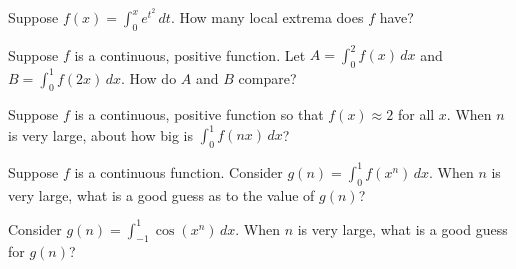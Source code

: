 \documentclass{ximera}
\newcommand{\recommendation}[1]{}
\begin{document}
\begin{shuffle}
\begin{problem}
  Suppose $f(x) = \int_0^x e^{t^2} \, dt$.  How many local extrema does $f$ have?
  \begin{multipleChoice}
  \end{multipleChoice}
\end{problem}



\begin{problem}
  Suppose $f$ is a continuous, positive function.  Let $A = \int_0^2 f(x) \, dx$ and $B = \int_0^1 f(2x) \, dx$.  How do $A$ and $B$ compare?
  \begin{multipleChoice}
  \end{multipleChoice}
\end{problem}

\begin{problem}
  Suppose $f$ is a continuous, positive function so that $f(x) \approx 2$ for all $x$.  When $n$ is very large, about how big is $\int_0^1 f(nx) \, dx$?
  \begin{multipleChoice}
   \end{multipleChoice}
\end{problem}

\begin{problem}
  Suppose $f$ is a continuous function.  Consider $g(n) = \int_0^1 f(x^n) \, dx$.  When $n$ is very large, what is a good guess as to the value of $g(n)$?
  \begin{multipleChoice}
  \end{multipleChoice}
\end{problem}

\begin{problem}
  Consider $g(n) = \int_{-1}^1 \cos(x^n) \, dx$.  When $n$ is very large, what is a good guess for $g(n)$?
  \begin{multipleChoice}
  \end{multipleChoice}
\end{problem}


\end{shuffle}
\end{document}

